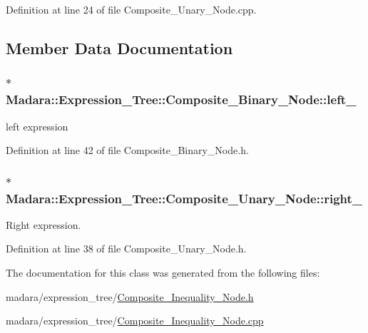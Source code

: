 Definition at line 24 of file Composite\_\-Unary\_\-Node.cpp.



\subsection{Member Data Documentation}
\hypertarget{classMadara_1_1Expression__Tree_1_1Composite__Binary__Node_acac60a70beb2484737e6e7161edb2d1b}{
\subsubsection[{left\_\-}]{$\ast$ {\bf Madara::Expression\_\-Tree::Composite\_\-Binary\_\-Node::left\_\-}}}
\label{df/d55/classMadara_1_1Expression__Tree_1_1Composite__Binary__Node_acac60a70beb2484737e6e7161edb2d1b}


left expression 



Definition at line 42 of file Composite\_\-Binary\_\-Node.h.

\hypertarget{classMadara_1_1Expression__Tree_1_1Composite__Unary__Node_a077b7bd1b52df6f5c6adfde735556a68}{
\subsubsection[{right\_\-}]{$\ast$ {\bf Madara::Expression\_\-Tree::Composite\_\-Unary\_\-Node::right\_\-}}}
\label{d3/dc7/classMadara_1_1Expression__Tree_1_1Composite__Unary__Node_a077b7bd1b52df6f5c6adfde735556a68}


Right expression. 



Definition at line 38 of file Composite\_\-Unary\_\-Node.h.



The documentation for this class was generated from the following files:\begin{DoxyCompactItemize}
\item 
madara/expression\_\-tree/\hyperlink{Composite__Inequality__Node_8h}{Composite\_\-Inequality\_\-Node.h}\item 
madara/expression\_\-tree/\hyperlink{Composite__Inequality__Node_8cpp}{Composite\_\-Inequality\_\-Node.cpp}\end{DoxyCompactItemize}
